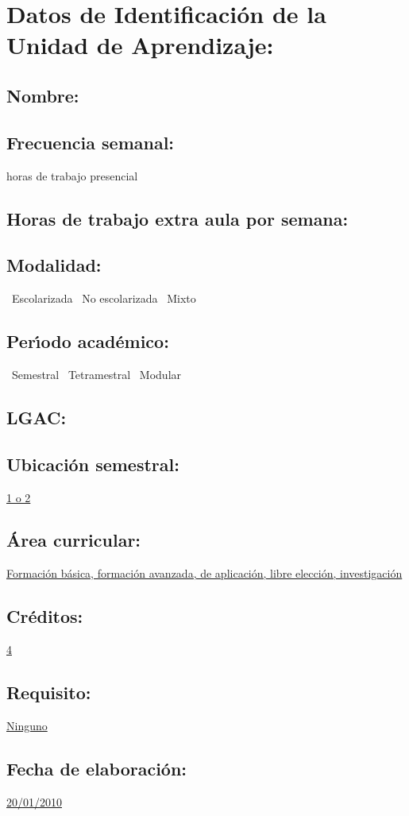 \documentclass[10 pt]{article}
\begin{document}

\section{Datos de Identificaci\'{o}n de la Unidad de Aprendizaje:}
\subsection{Nombre:} 
\subsection{Frecuencia semanal:} horas de trabajo presencial 
\subsection{Horas de trabajo extra aula por semana:} 
\subsection{Modalidad:} \yes~Escolarizada \no~No escolarizada \no~Mixto
\subsection{Per\'{\i}odo acad\'{e}mico:} \yes~Semestral
\no~Tetramestral \no~Modular
\subsection{LGAC:} \underline{\seys}
\subsection{Ubicaci\'{o}n semestral:} \underline{1 o 2}
\subsection{\'{A}rea curricular:} \underline{Formaci\'{o}n b\'{a}sica,
  formaci\'{o}n avanzada, de aplicaci\'{o}n, libre elecci\'{o}n, investigaci\'{o}n}
\subsection{Cr\'{e}ditos:} \underline{4}
\subsection{Requisito:} \underline{Ninguno}
\subsection{Fecha de elaboraci\'{o}n:} \underline{20/01/2010}
\end{document}
